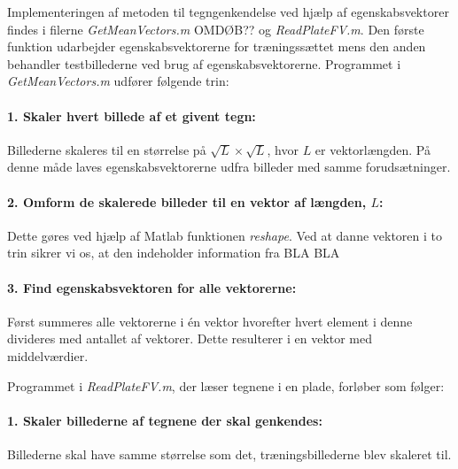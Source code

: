 Implementeringen af metoden til tegngenkendelse ved hjælp af egenskabsvektorer findes i filerne \textit{GetMeanVectors.m} OMDØB?? og \textit{ReadPlateFV.m}. Den første funktion udarbejder egenskabsvektorerne for træningssættet mens den anden behandler testbillederne ved brug af egenskabsvektorerne. Programmet i \textit{GetMeanVectors.m} udfører følgende trin:

\paragraph{1. Skaler hvert billede af et givent tegn:} Billederne skaleres til en størrelse på $\sqrt{L} \times \sqrt{L}$, hvor $L$ er vektorlængden. På denne måde laves egenskabsvektorerne udfra billeder med samme forudsætninger.

\paragraph{2. Omform de skalerede billeder til en vektor af længden, $L$:} Dette gøres ved hjælp af Matlab funktionen \textit{reshape}. Ved at danne vektoren i to trin sikrer vi os, at den indeholder information fra  BLA BLA

\paragraph{3. Find egenskabsvektoren for alle vektorerne:} Først summeres alle vektorerne i én vektor hvorefter hvert element i denne divideres med antallet af vektorer. Dette resulterer i en vektor med middelværdier.



Programmet i \textit{ReadPlateFV.m}, der læser tegnene i en plade, forløber som følger:

\paragraph{1. Skaler billederne af tegnene der skal genkendes:} Billederne skal have samme størrelse som det, træningsbillederne blev skaleret til.

